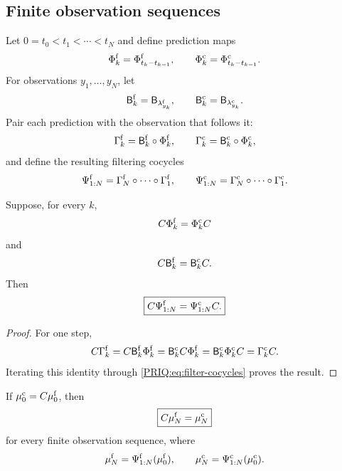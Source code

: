 \subsection{Finite observation sequences}
Let $0=t_0<t_1<\cdots<t_N$ and define prediction maps
\[
  \Phi_k^{\mathrm f}=\Phi_{t_k-t_{k-1}}^{\mathrm f},
  \qquad
  \Phi_k^{\mathrm c}=\Phi_{t_k-t_{k-1}}^{\mathrm c}.
\]
For observations $y_1,\ldots,y_N$, let
\[
  \mathsf B_k^{\mathrm f}=\mathsf B_{\lambda_{y_k}^{\mathrm f}},
  \qquad
  \mathsf B_k^{\mathrm c}=\mathsf B_{\lambda_{y_k}^{\mathrm c}}.
\]
Pair each prediction with the observation that follows it:
\[
  \Gamma_k^{\mathrm f}
  =\mathsf B_k^{\mathrm f}\circ\Phi_k^{\mathrm f},
  \qquad
  \Gamma_k^{\mathrm c}
  =\mathsf B_k^{\mathrm c}\circ\Phi_k^{\mathrm c},
\]
and define the resulting filtering cocycles
\begin{equation}\label{PRIQ:eq:filter-cocycles}
  \Psi_{1:N}^{\mathrm f}
  =\Gamma_N^{\mathrm f}\circ\cdots\circ\Gamma_1^{\mathrm f},
  \qquad
  \Psi_{1:N}^{\mathrm c}
  =\Gamma_N^{\mathrm c}\circ\cdots\circ\Gamma_1^{\mathrm c}.
\end{equation}

\begin{PRIQtheorem}\label{PRIQ:thm:exact-cocycle}
Suppose, for every $k$,
\begin{equation}\label{PRIQ:eq:step-flow-naturality}
  C\Phi_k^{\mathrm f}=\Phi_k^{\mathrm c}C
\end{equation}
and
\begin{equation}\label{PRIQ:eq:step-bayes-naturality}
  C\mathsf B_k^{\mathrm f}=\mathsf B_k^{\mathrm c}C.
\end{equation}
Then
\begin{equation}\label{PRIQ:eq:exact-cocycle-naturality}
  \boxed{
  C\Psi_{1:N}^{\mathrm f}
  =
  \Psi_{1:N}^{\mathrm c}C.}
\end{equation}
\end{PRIQtheorem}

\begin{proof}
For one step,
\[
  C\Gamma_k^{\mathrm f}
  =C\mathsf B_k^{\mathrm f}\Phi_k^{\mathrm f}
  =\mathsf B_k^{\mathrm c}C\Phi_k^{\mathrm f}
  =\mathsf B_k^{\mathrm c}\Phi_k^{\mathrm c}C
  =\Gamma_k^{\mathrm c}C.
\]
Iterating this identity through \eqref{PRIQ:eq:filter-cocycles} proves the result.
\end{proof}

\begin{PRIQcorollary}\label{PRIQ:cor:exact-posterior}
If $\mu_0^{\mathrm c}=C\mu_0^{\mathrm f}$, then
\[
  \boxed{C\mu_N^{\mathrm f}=\mu_N^{\mathrm c}}
\]
for every finite observation sequence, where
\[
  \mu_N^{\mathrm f}=\Psi_{1:N}^{\mathrm f}(\mu_0^{\mathrm f}),
  \qquad
  \mu_N^{\mathrm c}=\Psi_{1:N}^{\mathrm c}(\mu_0^{\mathrm c}).
\]
\end{PRIQcorollary}

